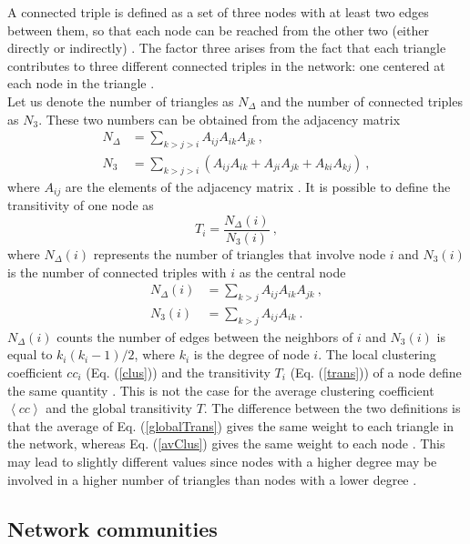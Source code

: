 \documentclass[11 pt , letterpaper , twoside , openright]{book}
\begin{document}
\newline
A connected triple is defined as a set of three nodes with at least two edges between them, so that each node can be reached from the other two (either directly or indirectly) \cite{Newman2003}. The factor three arises from the fact that each triangle contributes to three different connected triples in the network: one centered at each node in the triangle \cite{F.Costa2007}. \\
\newline
Let us denote the number of triangles as $N_{\Delta}$ and the number of connected triples as $N_3$. These two numbers can be obtained from the adjacency matrix
\begin{align}
	N_{\Delta} &= \sum_{k > j > i} A_{ij}A_{ik}A_{jk} \ , \\
	N_3 &= \sum_{k > j > i} (A_{ij}A_{ik} + A_{ji}A_{jk} + A_{ki}A_{kj}) \ ,
\end{align}
\newpage
\noindent
where $A_{ij}$ are the elements of the adjacency matrix \cite{F.Costa2007}. It is possible to define the transitivity of one node as
\begin{equation}\label{trans}
	T_i = \frac{N_{\Delta}(i)}{N_3(i)} \ ,
\end{equation}
where $N_{\Delta}(i)$ represents the number of triangles that involve node $i$ and $N_3(i)$ is the number of connected triples with $i$ as the central node \cite{F.Costa2007}
\begin{align}
	N_{\Delta}(i) &= \sum_{k > j} A_{ij}A_{ik}A_{jk} \ , \\
	N_3(i) &= \sum_{k > j} A_{ij}A_{ik} \ .
\end{align}
$N_{\Delta}(i)$ counts the number of edges between the neighbors of $i$ and $N_3(i)$ is equal to $k_i(k_i-1)/2$, where $k_i$ is the degree of node $i$. The local clustering coefficient $cc_i$ (Eq. (\ref{clus})) and the transitivity $T_i$ (Eq. (\ref{trans})) of a node define the same quantity \cite{F.Costa2007}. This is not the case for the average clustering coefficient $\left<cc\right>$ and the global transitivity $T$. The difference between the two definitions is that the average of Eq. (\ref{globalTrans}) gives the same weight to each triangle in the network, whereas Eq. (\ref{avClus}) gives the same weight to each node \cite{Newman2003}. This may lead to slightly different values since nodes with a higher degree may be involved in a higher number of triangles than nodes with a lower degree \cite{F.Costa2007}.
	
\subsection{Network communities}
\end{document}
